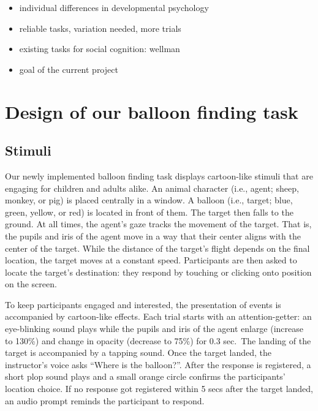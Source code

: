 \documentclass[
  man,floatsintext]{apa6}
\providecommand{\tightlist}{%
  \setlength{\itemsep}{0pt}\setlength{\parskip}{0pt}}
\begin{document}
\begin{itemize}
\tightlist
\item
  individual differences in developmental psychology
\item
  reliable tasks, variation needed, more trials
\item
  existing tasks for social cognition: wellman
\item
  goal of the current project
\end{itemize}

\hypertarget{design-of-our-balloon-finding-task}{%
\section{Design of our balloon finding task}\label{design-of-our-balloon-finding-task}}

\hypertarget{stimuli}{%
\subsection{Stimuli}\label{stimuli}}

Our newly implemented balloon finding task displays cartoon-like stimuli that are engaging for children and adults alike. An animal character (i.e., agent; sheep, monkey, or pig) is placed centrally in a window. A balloon (i.e., target; blue, green, yellow, or red) is located in front of them. The target then falls to the ground. At all times, the agent's gaze tracks the movement of the target. That is, the pupils and iris of the agent move in a way that their center aligns with the center of the target. While the distance of the target's flight depends on the final location, the target moves at a constant speed. Participants are then asked to locate the target's destination: they respond by touching or clicking onto position on the screen.

To keep participants engaged and interested, the presentation of events is accompanied by cartoon-like effects. Each trial starts with an attention-getter: an eye-blinking sound plays while the pupils and iris of the agent enlarge (increase to 130\%) and change in opacity (decrease to 75\%) for 0.3 sec.~The landing of the target is accompanied by a tapping sound. Once the target landed, the instructor's voice asks ``Where is the balloon?''. After the response is registered, a short plop sound plays and a small orange circle confirms the participants' location choice. If no response got registered within 5 secs after the target landed, an audio prompt reminds the participant to respond.
\end{document}
